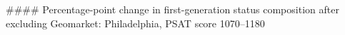 #### Percentage-point change in first-generation status composition after excluding Geomarket: Philadelphia, PSAT score 1070–1180
